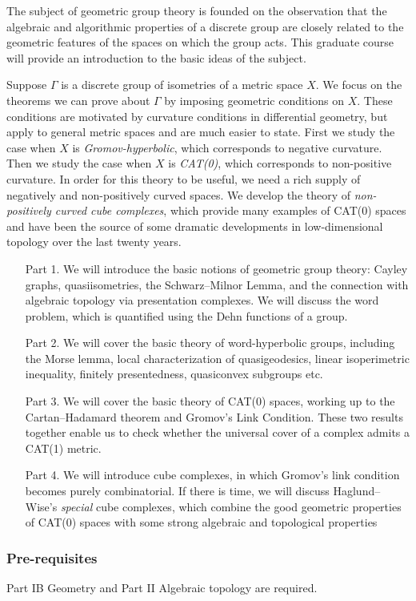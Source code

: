 \documentclass[a4paper]{article}
\begin{document}
\maketitle
{\small
\setlength{\parindent}{0em}
\setlength{\parskip}{1em}

The subject of geometric group theory is founded on the observation that the algebraic and algorithmic properties of a discrete group are closely related to the geometric features of the spaces on which the group acts. This graduate course will provide an introduction to the basic ideas of the subject.

Suppose $\Gamma$ is a discrete group of isometries of a metric space $X$. We focus on the theorems we can prove about $\Gamma$ by imposing geometric conditions on $X$. These conditions are motivated by curvature conditions in differential geometry, but apply to general metric spaces and are much easier to state. First we study the case when $X$ is \emph{Gromov-hyperbolic}, which corresponds to negative curvature. Then we study the case when $X$ is \emph{CAT(0)}, which corresponds to non-positive curvature. In order for this theory to be useful, we need a rich supply of negatively and non-positively curved spaces. We develop the theory of \emph{non-positively curved cube complexes}, which provide many examples of CAT(0) spaces and have been the source of some dramatic developments in low-dimensional topology over the last twenty years.

\begin{itemize}
 \item[Part 1.] We will introduce the basic notions of geometric group theory: Cayley graphs, quasiisometries, the Schwarz--Milnor Lemma, and the connection with algebraic topology via presentation complexes. We will discuss the word problem, which is quantified using the Dehn functions of a group.
 \item[Part 2.] We will cover the basic theory of word-hyperbolic groups, including the Morse lemma, local characterization of quasigeodesics, linear isoperimetric inequality, finitely presentedness, quasiconvex subgroups etc.
 \item[Part 3.] We will cover the basic theory of CAT(0) spaces, working up to the Cartan--Hadamard theorem and Gromov's Link Condition. These two results together enable us to check whether the universal cover of a complex admits a CAT(1) metric.
 \item[Part 4.] We will introduce cube complexes, in which Gromov's link condition becomes purely combinatorial. If there is time, we will discuss Haglund--Wise's \emph{special} cube complexes, which combine the good geometric properties of CAT(0) spaces with some strong algebraic and topological properties
\end{itemize}

\subsubsection*{Pre-requisites}
Part IB Geometry and Part II Algebraic topology are required.
}
\end{document}
